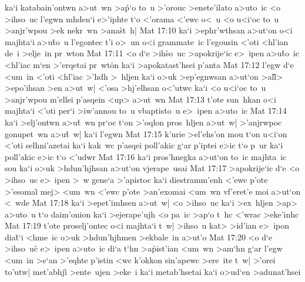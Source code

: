 ka`i
katabain'ontwn
a>ut~wn
>a\r{p}`o
to~u
>'orouc
>enete'ilato
a>uto~ic
<o
>ihso~uc
l'egwn
mhden`i
e>'iphte
t`o
<'orama
<'ewc
o<~u
<o
u<i`oc
to~u
>anjr'wpou
>ek
nekr~wn
>ana\r{s}t~h|\bibvsend
{}
\vs Mat 17:10
ka`i
>ephr'wthsan
a>ut`on
o<i
majhta`i
a>u\r{t}o~u
l'egontec
t'i
o>~un
o<i
grammate~ic
l'egousin
<'oti
<hl'ian
de~i
>elje~in
pr~wton\bibvsend
\vs Mat 17:11
<o
d`e
>ih\r{s}o~uc
>apokrije`ic
e>~ipen
a>u\r{t}o~ic
<hl'iac
m`en
>'erqetai
pr~wt\r{o}n
ka`i
>apokatast'hsei
p'anta\bibvsend
\vs Mat 17:12
l'egw
d`e
<um~in
<'oti
<hl'iac
>'hdh
>~hljen
ka`i
o>uk
>ep'egnwsan
a>ut`on
>al\r{l}>
>epo'ihsan
>en
a>ut~w|
<'osa
>hj'elhsan
o<'utwc
ka`i
<o
u<i`oc
to~u
>anjr'wpou
m'ellei
p'asqein
<up>
a>ut~wn\bibvsend
\vs Mat 17:13
t'ote
sun~hkan
o<i
majhta`i
<'oti
per`i
>iw'annou
to~u
vbaptisto~u
e>~ipen
a>uto~ic\bibvsend
\vs Mat 17:14
ka`i
>elj'ontwn
a>u\r{t}~wn
pr`oc
t`on
>'oqlon
pros~hljen
a>ut~w|
>'anjrwpoc
gonupet~wn
a>u\r{t}~w|
ka`i
l'egwn\bibvsend
\vs Mat 17:15
k'urie
>el'ehs'on
mou
t`on
u<i`on
<'oti
selhni'azetai
ka`i
kak~wc
p'asqei
poll'akic
g`ar
p'iptei
e>ic
t`o
p~ur
ka`i
poll'akic
e>ic
t`o
<'udwr\bibvsend
\vs Mat 17:16
ka`i
pros'hnegka
a>ut`on
to~ic
majhta~ic
sou
ka`i
o>uk
>hdun'hjhsan
a>ut`on
vjerape~usai\bibvsend
\vs Mat 17:17
>apokrije`ic
d`e
<o
>ihso~uc
e>~ipen
>~w
gene`a
>'apistoc
ka`i
diestramm'enh
<'ewc
p'ote
>'esomai\r{}
mej>
<um~wn
<'ewc
p'ote
>an'exomai
<um~wn
vf'eret'e
moi
a>ut`on
<~wde\bibvsend
\vs Mat 17:18
ka`i
>epet'imhsen
a>ut~w|
<o
>ihso~uc
ka`i
>ex~hljen
>ap>
a>uto~u
t`o
daim'onion
ka`i
>ejerape'ujh
<o
pa~ic
>ap`o
t~hc
<'wrac
>eke'inhc\bibvsend
\vs Mat 17:19
t'ote
proselj'ontec
o<i
majhta`i
t~w|
>ihso~u
kat>
>id'ian
e>~ipon
dia\r{t}`i
<hme~ic
o>uk
>hdun'hjhmen
>ekbale~in
a>ut'o\bibvsend
\vs Mat 17:20
<o
d`e
>ihso~uc\r{}
e>~ipen
a>uto~ic
di`a
t`hn
>a\r{p}ist'ian
<um~wn
>am`hn
g`ar
l'egw
<um~in
>e`an
>'eqhte
p'istin
<wc
k'okkon
sin'apewc
>ere~ite
t~w|
>'orei
to'utw|
met'abhji\r{}
>ente~ujen
>eke~i
ka`i
metab'hsetai
ka`i
o>ud`en
>adunat'hsei
